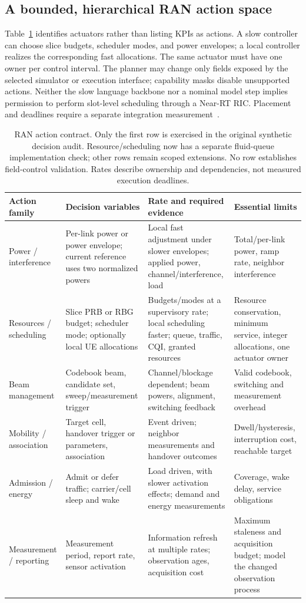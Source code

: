 \subsection{A bounded, hierarchical RAN action space}
Table~\ref{tab:planner-actions} identifies actuators rather than listing KPIs
as actions. A slow controller can choose slice budgets, scheduler modes, and
power envelopes; a local controller realizes the corresponding fast allocations.
The same actuator must have one owner per control interval. The planner may
change only fields exposed by the selected simulator or execution interface;
capability masks disable unsupported actions. Neither the slow language backbone
nor a nominal model step implies permission to perform slot-level scheduling
through a Near-RT RIC. Placement and deadlines require a separate integration
measurement~\cite{oran2026}.

\begin{table}[t]
\centering
\small
\caption{RAN action contract. Only the first row is exercised in the
original synthetic decision audit. Resource/scheduling now has a separate
fluid-queue implementation check; other rows remain scoped extensions.
No row establishes field-control validation. Rates describe
ownership and dependencies, not measured execution deadlines.}
\label{tab:planner-actions}
\begin{tabular}{p{}p{}p{}p{}}
\toprule
Action family & Decision variables & Rate and required evidence & Essential limits \\
\midrule
Power / interference & Per-link power or power envelope; current reference uses
two normalized powers & Local fast adjustment under slower envelopes;
applied power, channel/interference, load & Total/per-link power, ramp rate,
neighbor interference \\
Resources / scheduling & Slice PRB or RBG budget; scheduler mode; optionally local
UE allocations & Budgets/modes at a supervisory rate; local scheduling faster;
queue, traffic, CQI, granted resources & Resource conservation, minimum service,
integer allocations, one actuator owner \\
Beam management & Codebook beam, candidate set, sweep/measurement trigger &
Channel/blockage dependent; beam powers, alignment, switching feedback & Valid
codebook, switching and measurement overhead \\
Mobility / association & Target cell, handover trigger or parameters, association &
Event driven; neighbor measurements and handover outcomes & Dwell/hysteresis,
interruption cost, reachable target \\
Admission / energy & Admit or defer traffic; carrier/cell sleep and wake &
Load driven, with slower activation effects; demand and energy measurements &
Coverage, wake delay, service obligations \\
Measurement / reporting & Measurement period, report rate, sensor activation &
Information refresh at multiple rates; observation ages, acquisition cost &
Maximum staleness and acquisition budget; model the changed observation process \\
\bottomrule
\end{tabular}
\end{table}

